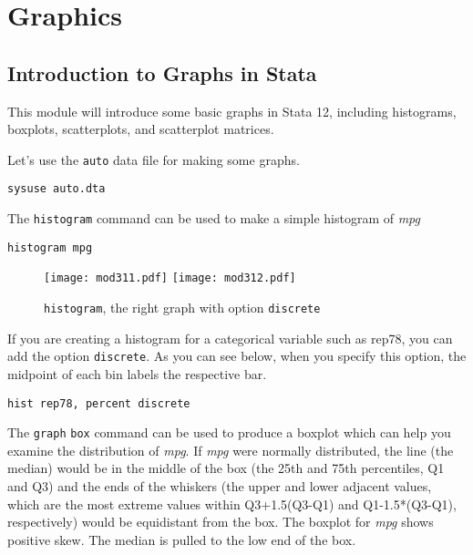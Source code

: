 \section{Graphics}
\subsection{Introduction to Graphs in Stata}

This module will introduce some basic graphs in Stata 12, including histograms, boxplots, scatterplots, and scatterplot matrices.

Let's use the \lstinline{auto} data file for making some graphs.

\begin{lstlisting}
sysuse auto.dta
\end{lstlisting}

The \lstinline{histogram} command can be used to make a simple histogram of \textit{mpg}

\begin{lstlisting}
histogram mpg
\end{lstlisting}

\begin{figure}[!htbp]
\centering
\texttt{[image: mod311.pdf]}
\texttt{[image: mod312.pdf]}
\caption{\lstinline{histogram}, the right graph with option \lstinline{discrete}\label{histogram}}
\end{figure}

If you are creating a histogram for a categorical variable such as rep78,  you can add the option \lstinline{discrete}. As you can see below, when you specify this option, the midpoint of each bin labels the respective bar.

\begin{lstlisting}
hist rep78, percent discrete
\end{lstlisting}

The \lstinline{graph} \lstinline{box} command can be used to produce a boxplot which can help you examine the distribution of \textit{mpg}. If \textit{mpg} were normally distributed, the line (the median) would be in the middle of the box (the 25th and 75th percentiles, Q1 and Q3) and the ends of the whiskers (the upper and lower adjacent values, which are the most extreme values within Q3+1.5(Q3-Q1) and Q1-1.5*(Q3-Q1), respectively) would be equidistant from the box. The boxplot for \textit{mpg} shows positive skew. The median is pulled to the low end of the box.

